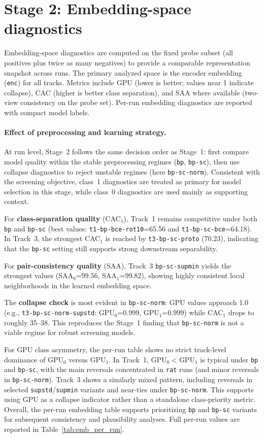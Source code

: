 \section{Stage 2: Embedding-space diagnostics}
Embedding-space diagnostics are computed on the fixed probe subset (all positives plus twice as many negatives) to provide a comparable representation snapshot across runs.
The primary analyzed space is the encoder embedding (\texttt{enc}) for all tracks.
Metrics include GPU (lower is better; values near 1 indicate collapse), CAC (higher is better class separation), and SAA where available (two-view consistency on the probe set).
Per-run embedding diagnostics are reported with compact model labels.

\paragraph{Effect of preprocessing and learning strategy.}
At run level, Stage~2 follows the same decision order as Stage~1: first compare model quality within the stable preprocessing regimes (\texttt{bp}, \texttt{bp-sc}), then use collapse diagnostics to reject unstable regimes (here \texttt{bp-sc-norm}).
Consistent with the screening objective, class~1 diagnostics are treated as primary for model selection in this stage, while class~0 diagnostics are used mainly as supporting context.

For \textbf{class-separation quality} (CAC$_1$), Track~1 remains competitive under both \texttt{bp} and \texttt{bp-sc} (best values: \texttt{t1-bp-bce-rot10}=65.56 and \texttt{t1-bp-sc-bce}=64.18). In Track~3, the strongest CAC$_1$ is reached by \texttt{t3-bp-sc-proto} (70.23), indicating that the \texttt{bp-sc} setting still supports strong downstream separability.

For \textbf{pair-consistency quality} (SAA), Track~3 \texttt{bp-sc-supmin} yields the strongest values (SAA$_0$=99.56, SAA$_1$=99.82), showing highly consistent local neighborhoods in the learned embedding space.

The \textbf{collapse check} is most evident in \texttt{bp-sc-norm}: GPU values approach 1.0 (e.g., \texttt{t3-bp-sc-norm-supstd}: GPU$_0$=0.999, GPU$_1$=0.999) while CAC$_1$ drops to roughly 35--38.
This reproduces the Stage~1 finding that \texttt{bp-sc-norm} is not a viable regime for robust screening models.

For GPU class asymmetry, the per-run table shows no strict track-level dominance of GPU$_0$ versus GPU$_1$.
In Track~1, GPU$_0<$GPU$_1$ is typical under \texttt{bp} and \texttt{bp-sc}, with the main reversals concentrated in \texttt{rat} runs (and minor reversals in \texttt{bp-sc-norm}).
Track~3 shows a similarly mixed pattern, including reversals in selected \texttt{supstd}/\texttt{supmin} variants and near-ties under \texttt{bp-sc-norm}.
This supports using GPU as a collapse indicator rather than a standalone class-priority metric.
Overall, the per-run embedding table supports prioritizing \texttt{bp} and \texttt{bp-sc} variants for subsequent consistency and plausibility analyses.
Full per-run values are reported in Table~\ref{tab:emb_per_run}.

